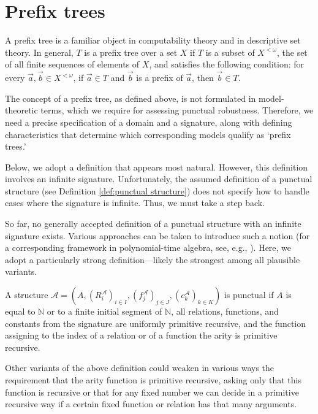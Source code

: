 \documentclass[a4paper,UKenglish,cleveref, autoref, thm-restate]{lipics-v2021}
\begin{document}
\section{Prefix trees}\label{app:pref-trees}
A prefix tree is a familiar object in computability theory and in descriptive set theory. In general, $T$ is a prefix tree over a set $X$ if $T$ is a subset of $X^{<\omega}$, the set of all finite sequences of elements of $X$, and satisfies the following condition: for every $\vec a, \vec b \in X^{<\omega}$, if $\vec a \in T$ and $\vec b$ is a prefix of $\vec a$, then $\vec b \in T$.

The concept of a prefix tree, as defined above, is not formulated in model-theoretic terms, which we require for assessing punctual robustness. Therefore, we need a precise specification of a domain and a signature, along with defining characteristics that determine which corresponding models qualify as `prefix trees.'

Below, we adopt a definition that appears most natural. However, this definition involves an infinite signature. Unfortunately, the assumed definition of a punctual structure (see Definition \ref{def:punctual structure}) does not specify how to handle cases where the signature is infinite. Thus, we must take a step back.

So far, no generally accepted definition of a punctual structure with an infinite signature exists. Various approaches can be taken to introduce such a notion (for a corresponding framework in polynomial-time algebra, see, e.g., \cite{cenzer_feasibly}). Here, we adopt a particularly strong definition---likely the strongest among all plausible variants.

\begin{definition}
    A structure $\mathcal{A}=(A, (R_i^{\mathcal{A}})_{i \in I},(f_j^{\mathcal{A}})_{j \in J},(c_k^{\mathcal{A}})_{k \in K})$ is punctual if $A$ is equal to $\mathbb N$ or to a finite initial segment of $\mathbb N$, all relations, functions, and constants from the signature are uniformly primitive recursive, and the function assigning to the index of a relation or of a function the arity is primitive recursive.
\end{definition}

Other variants of the above definition could weaken in various ways the requirement that the arity function is primitive recursive, asking only that this function is recursive or that for any fixed number we can decide in a primitive recursive way if a certain fixed function or relation has that many arguments.
\end{document}
